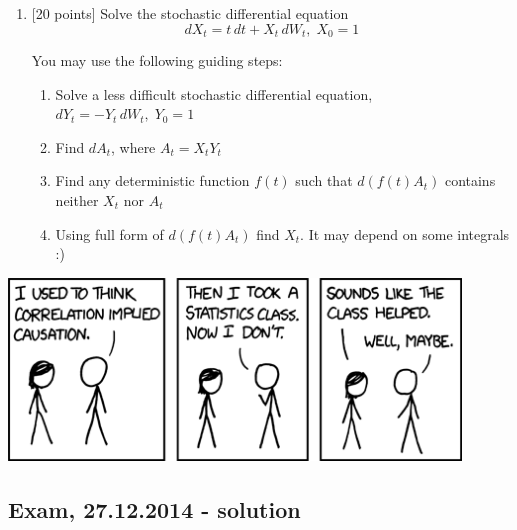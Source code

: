 \documentclass[12pt, a4paper]{article}
\begin{document}
\begin{enumerate}
\item {[20 points]} Solve the stochastic differential equation
\[
dX_t = t \, dt + X_t \, dW_t, \; X_0=1
\]

You may use the following guiding steps:
\begin{enumerate}
\item Solve a less difficult stochastic differential equation, $dY_t=-Y_t \, dW_t, \; Y_0=1$
\item Find $dA_t$, where $A_t=X_t Y_t$
\item Find any deterministic function $f(t)$ such that $d(f(t) A_t)$ contains neither $X_t$ nor $A_t$
\item Using full form of $d(f(t) A_t)$ find $X_t$. It may depend on some integrals :)
\end{enumerate}

\end{enumerate}


\begin{center}
\includegraphics[width=12cm]{figures/correlation.png}
\end{center}


\subsection{Exam, 27.12.2014 - solution}
\end{document}
